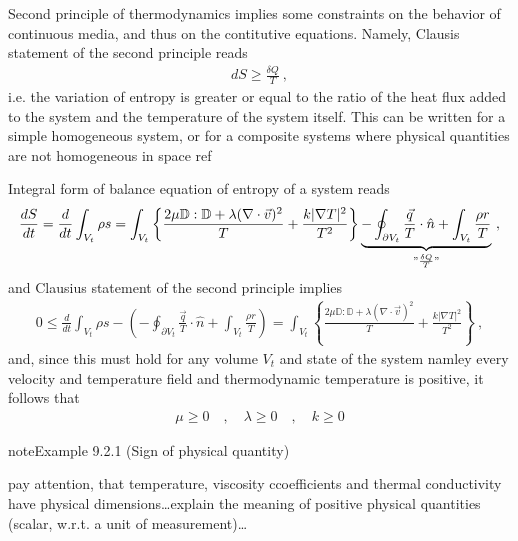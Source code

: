 \documentclass[letterpaper,10pt,english]{jupyterBook}
\begin{document}
\sphinxAtStartPar
{} Second principle of thermodynamics implies some constraints on the behavior of continuous media, and thus on the contitutive equations. Namely, Clausis statement of the second principle reads
\begin{equation*}
\begin{split}d S \ge \frac{\delta Q}{T} \ ,\end{split}
\end{equation*}
\sphinxAtStartPar
i.e. the variation of entropy is greater or equal to the ratio of the heat flux added to the system and the temperature of the system itself. This can be written for a simple homogeneous system, or for a composite systems where physical quantities are not homogeneous in space  ref

\sphinxAtStartPar
Integral form of balance equation of entropy of a system reads
\begin{equation*}
\begin{split}\frac{d S}{dt} = \frac{d}{dt} \int_{V_t} \rho s = \int_{V_t} \left\{ \frac{ 2 \mu \mathbb{D} : \mathbb{D} + \lambda (\nabla \cdot \vec{v})^2}{T} + \frac{k |\nabla T|^2}{T^2} \right\} \underbrace{- \oint_{\partial V_t} \frac{\vec{q}}{T} \cdot \hat{n} + \int_{V_t} \frac{\rho r}{T}}_{"\frac{\delta Q}{T}"} \ ,\end{split}
\end{equation*}
\sphinxAtStartPar
and Clausius statement of the second principle implies
\begin{equation*}
\begin{split}0 \le \frac{d}{dt} \int_{V_t} \rho s - \left( - \oint_{\partial V_t} \frac{\vec{q}}{T} \cdot \hat{n} + \int_{V_t} \frac{\rho r}{T} \right) = \int_{V_t} \left\{ \frac{ 2 \mu \mathbb{D} : \mathbb{D} + \lambda (\nabla \cdot \vec{v})^2}{T} + \frac{k |\nabla T|^2}{T^2} \right\} \ ,\end{split}
\end{equation*}
\sphinxAtStartPar
and, since this must hold for any volume \(V_t\) and state of the system \sphinxhyphen{} namley every velocity and temperature field \sphinxhyphen{} and thermodynamic temperature is positive, it follows that
\begin{equation*}
\begin{split}\mu \ge 0 \quad , \quad \lambda \ge 0 \quad , \quad k \ge 0\end{split}
\end{equation*}\label{ch/fluids/governing-equations:example-1}
\begin{sphinxadmonition}{note}{Example 9.2.1 (Sign of physical quantity)}



\sphinxAtStartPar
{} pay attention, that temperature, viscosity ccoefficients and thermal conductivity have physical dimensions…explain the meaning of positive physical quantities (scalar, w.r.t. a unit of measurement)…
\end{sphinxadmonition}
\end{document}
